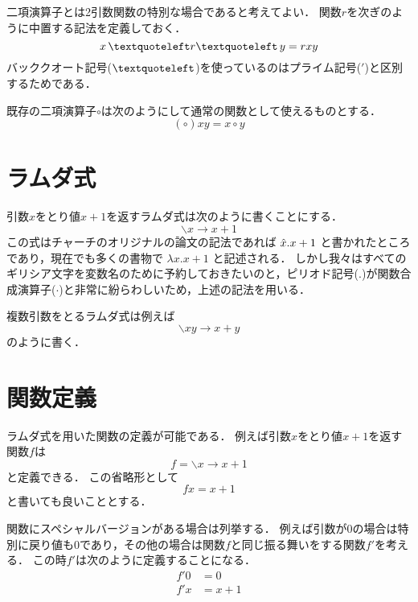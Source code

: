\documentclass[twocolumn]{jsbook}
\begin{document}
二項演算子とは2引数関数の特別な場合であると考えてよい．
関数$r$を次ぎのように中置する記法を定義しておく．
\begin{equation}
x\,\textquoteleft r\textquoteleft\,y=rxy
\end{equation}
バッククオート記号($\textquoteleft$)を使っているのはプライム記号($'$)と区別するためである．

既存の二項演算子$\circ$は次のようにして通常の関数として使えるものとする．
\begin{equation}
(\circ)xy=x\circ y
\end{equation}

\section{ラムダ式}

引数$x$をとり値$x+1$を返すラムダ式は次のように書くことにする．
\begin{equation}
\backslash x\rightarrow x+1
\end{equation}
この式はチャーチのオリジナルの論文の記法であれば $\Hat x.x+1$ と書かれたところであり，現在でも多くの書物で $\lambda x.x+1$ と記述される．
しかし我々はすべてのギリシア文字を変数名のために予約しておきたいのと，ピリオド記号($.$)が関数合成演算子($\cdot$)と非常に紛らわしいため，上述の記法を用いる．

複数引数をとるラムダ式は例えば $$\backslash xy\rightarrow x+y$$ のように書く．

\section{関数定義}

ラムダ式を用いた関数の定義が可能である．
例えば引数$x$をとり値$x+1$を返す関数$f$は
\begin{equation}
f=\backslash x\rightarrow x+1
\end{equation}
と定義できる．
この省略形として
\begin{equation}
fx=x+1
\end{equation}
と書いても良いこととする．

関数にスペシャルバージョンがある場合は列挙する．
例えば引数が0の場合は特別に戻り値も0であり，その他の場合は関数$f$と同じ振る舞いをする関数$f'$を考える．
この時$f'$は次のように定義することになる．
\begin{equation}
\begin{split}
f'0&=0\\
f'x&=x+1
\end{split}
\end{equation}
\end{document}
